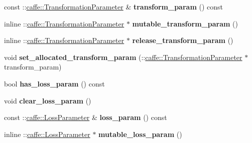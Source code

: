 \begin{DoxyCompactItemize}
const \+::\mbox{\hyperlink{classcaffe_1_1_transformation_parameter}{caffe\+::\+Transformation\+Parameter}} \& {\bfseries transform\+\_\+param} () const
\item 
\mbox{\label{classcaffe_1_1_v1_layer_parameter_a73a62900b5fd66fb04a696a67678ffbd}} 
inline \+::\mbox{\hyperlink{classcaffe_1_1_transformation_parameter}{caffe\+::\+Transformation\+Parameter}} $\ast$ {\bfseries mutable\+\_\+transform\+\_\+param} ()
\item 
\mbox{\label{classcaffe_1_1_v1_layer_parameter_a8daf24cfe6bd140b97953c77b9fa433b}} 
inline \+::\mbox{\hyperlink{classcaffe_1_1_transformation_parameter}{caffe\+::\+Transformation\+Parameter}} $\ast$ {\bfseries release\+\_\+transform\+\_\+param} ()
\item 
\mbox{\label{classcaffe_1_1_v1_layer_parameter_a6c2e49a1b98d745bf167d70cd062bb3a}} 
void {\bfseries set\+\_\+allocated\+\_\+transform\+\_\+param} (\+::\mbox{\hyperlink{classcaffe_1_1_transformation_parameter}{caffe\+::\+Transformation\+Parameter}} $\ast$transform\+\_\+param)
\item 
\mbox{\label{classcaffe_1_1_v1_layer_parameter_a9033767eefb4abd9dd6bf70216cc3368}} 
bool {\bfseries has\+\_\+loss\+\_\+param} () const
\item 
\mbox{\label{classcaffe_1_1_v1_layer_parameter_a8686e9ec87a957da48f19984b140a73a}} 
void {\bfseries clear\+\_\+loss\+\_\+param} ()
\item 
\mbox{\label{classcaffe_1_1_v1_layer_parameter_aa61fa046ac0717c964f65e47e0a9c080}} 
const \+::\mbox{\hyperlink{classcaffe_1_1_loss_parameter}{caffe\+::\+Loss\+Parameter}} \& {\bfseries loss\+\_\+param} () const
\item 
\mbox{\label{classcaffe_1_1_v1_layer_parameter_a344c1add04f503ff5cb4c3a09520a502}} 
inline \+::\mbox{\hyperlink{classcaffe_1_1_loss_parameter}{caffe\+::\+Loss\+Parameter}} $\ast$ {\bfseries mutable\+\_\+loss\+\_\+param} ()
\item 
\mbox{\label{classcaffe_1_1_v1_layer_parameter_a202ac5a0e1739eb126557df62f477812}} 

\end{DoxyCompactItemize}
